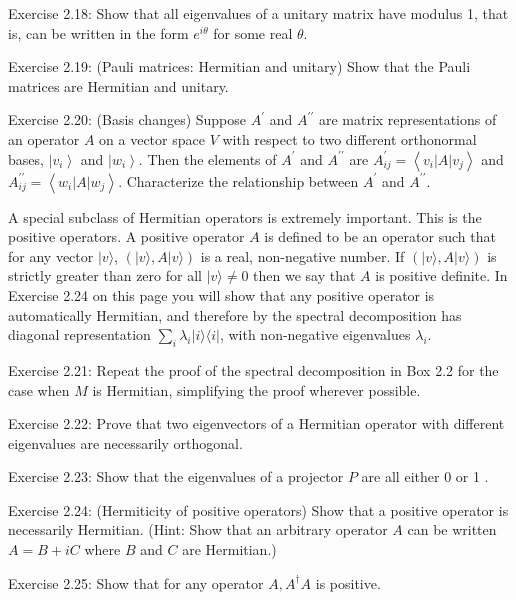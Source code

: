 Exercise 2.18: Show that all eigenvalues of a unitary matrix have modulus 1, that is, can be written in the form $e^{i \theta}$ for some real $\theta$.

Exercise 2.19: (Pauli matrices: Hermitian and unitary) Show that the Pauli matrices are Hermitian and unitary.

Exercise 2.20: (Basis changes) Suppose $A^{\prime}$ and $A^{\prime \prime}$ are matrix representations of an operator $A$ on a vector space $V$ with respect to two different orthonormal bases, $\left|v_{i}\right\rangle$ and $\left|w_{i}\right\rangle$. Then the elements of $A^{\prime}$ and $A^{\prime \prime}$ are $A_{i j}^{\prime}=\left\langle v_{i}|A| v_{j}\right\rangle$ and $A_{i j}^{\prime \prime}=\left\langle w_{i}|A| w_{j}\right\rangle$. Characterize the relationship between $A^{\prime}$ and $A^{\prime \prime}$.

A special subclass of Hermitian operators is extremely important. This is the positive operators. A positive operator $A$ is defined to be an operator such that for any vector $|v\rangle$, $(|v\rangle, A|v\rangle)$ is a real, non-negative number. If $(|v\rangle, A|v\rangle)$ is strictly greater than zero for all $|v\rangle \neq 0$ then we say that $A$ is positive definite. In Exercise 2.24 on this page you will show that any positive operator is automatically Hermitian, and therefore by the spectral decomposition has diagonal representation $\sum_{i} \lambda_{i}|i\rangle\langle i|$, with non-negative eigenvalues $\lambda_{i}$.

Exercise 2.21: Repeat the proof of the spectral decomposition in Box 2.2 for the case when $M$ is Hermitian, simplifying the proof wherever possible.

Exercise 2.22: Prove that two eigenvectors of a Hermitian operator with different eigenvalues are necessarily orthogonal.

Exercise 2.23: Show that the eigenvalues of a projector $P$ are all either 0 or 1 .

Exercise 2.24: (Hermiticity of positive operators) Show that a positive operator is necessarily Hermitian. (Hint: Show that an arbitrary operator $A$ can be written $A=B+i C$ where $B$ and $C$ are Hermitian.)

Exercise 2.25: Show that for any operator $A, A^{\dagger} A$ is positive.